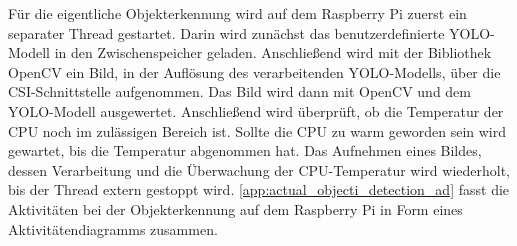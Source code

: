 Für die eigentliche Objekterkennung wird auf dem Raspberry Pi zuerst ein separater Thread gestartet.
Darin wird zunächst das benutzerdefinierte \ac{YOLO}-Modell in den Zwischenspeicher geladen.
Anschließend wird mit der Bibliothek OpenCV ein Bild, in der Auflösung des verarbeitenden \ac{YOLO}-Modells, über die \ac{CSI}-Schnittstelle aufgenommen.
Das Bild wird dann mit OpenCV und dem \ac{YOLO}-Modell ausgewertet.
Anschließend wird überprüft, ob die Temperatur der \ac{CPU} noch im zulässigen Bereich ist.
Sollte die \ac{CPU} zu warm geworden sein wird gewartet, bis die Temperatur abgenommen hat.
Das Aufnehmen eines Bildes, dessen Verarbeitung und die Überwachung der \ac{CPU}-Temperatur wird wiederholt, bis der Thread extern gestoppt wird.
\autoref{app:actual_objecti_detection_ad} fasst die Aktivitäten bei der Objekterkennung auf dem Raspberry Pi in Form eines Aktivitätendiagramms zusammen.